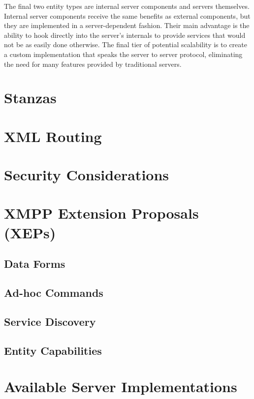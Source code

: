 The final two entity types are internal server components and servers themselves.
Internal server components receive the same benefits as external components, but
they are implemented in a server-dependent fashion. Their main advantage is the
ability to hook directly into the server's internals to provide services that
would not be as easily done otherwise. The final tier of potential scalability
is to create a custom implementation that speaks the server to server protocol,
eliminating the need for many features provided by traditional servers.

\section{Stanzas}

\section{XML Routing}

\section{Security Considerations}

\section{XMPP Extension Proposals (XEPs)}

\subsection{Data Forms}

\subsection{Ad-hoc Commands}

\subsection{Service Discovery}

\subsection{Entity Capabilities}

\section{Available Server Implementations}
